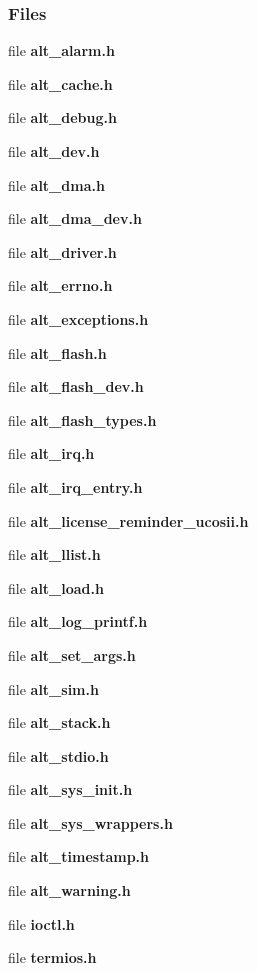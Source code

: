 \subsubsection*{Files}
\begin{DoxyCompactItemize}
\item 
file {\bf alt\+\_\+alarm.\+h}
\item 
file {\bf alt\+\_\+cache.\+h}
\item 
file {\bf alt\+\_\+debug.\+h}
\item 
file {\bf alt\+\_\+dev.\+h}
\item 
file {\bf alt\+\_\+dma.\+h}
\item 
file {\bf alt\+\_\+dma\+\_\+dev.\+h}
\item 
file {\bf alt\+\_\+driver.\+h}
\item 
file {\bf alt\+\_\+errno.\+h}
\item 
file {\bf alt\+\_\+exceptions.\+h}
\item 
file {\bf alt\+\_\+flash.\+h}
\item 
file {\bf alt\+\_\+flash\+\_\+dev.\+h}
\item 
file {\bf alt\+\_\+flash\+\_\+types.\+h}
\item 
file {\bf alt\+\_\+irq.\+h}
\item 
file {\bf alt\+\_\+irq\+\_\+entry.\+h}
\item 
file {\bf alt\+\_\+license\+\_\+reminder\+\_\+ucosii.\+h}
\item 
file {\bf alt\+\_\+llist.\+h}
\item 
file {\bf alt\+\_\+load.\+h}
\item 
file {\bf alt\+\_\+log\+\_\+printf.\+h}
\item 
file {\bf alt\+\_\+set\+\_\+args.\+h}
\item 
file {\bf alt\+\_\+sim.\+h}
\item 
file {\bf alt\+\_\+stack.\+h}
\item 
file {\bf alt\+\_\+stdio.\+h}
\item 
file {\bf alt\+\_\+sys\+\_\+init.\+h}
\item 
file {\bf alt\+\_\+sys\+\_\+wrappers.\+h}
\item 
file {\bf alt\+\_\+timestamp.\+h}
\item 
file {\bf alt\+\_\+warning.\+h}
\item 
file {\bf ioctl.\+h}
\item 
file {\bf termios.\+h}
\end{DoxyCompactItemize}
